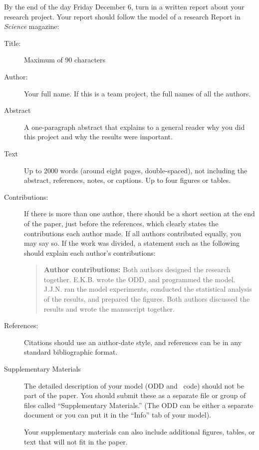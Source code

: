 \documentclass{jghandout}
\begin{document}
\begin{description}
    By the end of the day Friday December 6, turn in a written report about
    your research project. Your report should follow the model of a research
    Report in \emph{Science\/} magazine:
    \begin{description}
        \item[Title:] Maximum of 90 characters
        \item[Author:] Your full name. If this is a team project, the full
        names of all the authors.
        \item[Abstract] A one-paragraph abstract that explains to a general
        reader why you did this project and why the results were important.
        \item[Text] Up to 2000 words (around eight pages, double-spaced), not
        including the abstract, references, notes, or captions. Up to four
        figures or tables.
      \item[Contributions:] If there is more than one author, there should be
        a short section at the end of the paper, just before the references,
        which clearly states the contributions each author made. If all
        authors contributed equally, you may say so. If the work was divided,
       a statement such as the following should explain each author's
       contributions:
       \begin{quote}
         \textbf{Author contributions:} Both authors designed the research
         together.
         E.K.B. wrote the ODD, and programmed the model.
         J.J.N. ran the model experiments, conducted the statistical analysis
         of the results, and prepared the figures.
         Both authors discussed the results and wrote the manuscript together.
       \end{quote}
        \item[References:] Citations
        should use an author-date style, and
        references can be in any standard bibliographic format.
        \item[Supplementary Materials] The detailed description of your model
        (ODD and \NetLogo\ code) should not be part of the paper. You should
        submit these as a separate file or group of files called ``Supplementary
        Materials.'' (The ODD can be either a separate document or you can put it
        in the ``Info'' tab of your model).
        \setlength{\parindent}{1em}

        Your supplementary materials can also include additional figures, tables,
        or text that will not fit in the paper.


\end{description}
\end{description}
\end{document}

